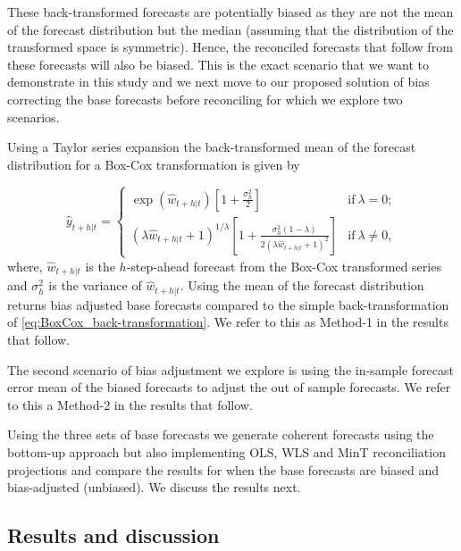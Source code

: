 \documentclass[12pt]{article}
\theoremstyle{definition}
\theoremstyle{property}
\begin{document}
These back-transformed forecasts are potentially biased as they are not the mean of the forecast distribution but the median (assuming that the distribution of the transformed space is symmetric). Hence, the reconciled forecasts that follow from these forecasts will also be biased. This is the exact scenario that we want to demonstrate in this study and we next move to our proposed solution of bias correcting the base forecasts before reconciling for which we explore two scenarios.

Using a Taylor series expansion  the back-transformed mean of the forecast distribution for a Box-Cox transformation is given by

\begin{equation} \label{eq:BoxCox_BT_biasadj}
	 \hat{y}_{t+h|t} =
	\begin{cases}
	\exp({\hat{w}_{t+h|t}})[1+\frac{\sigma_h^2}{2}] & \text{if}~\lambda = 0; \\
	(\lambda \hat{w}_{t+h|t} + 1)^{1/\lambda}[1 + \frac{\sigma_h^2(1-\lambda)}{2(\lambda \hat{w}_{t+h|t} + 1)^2}]       & \text{if}~\lambda \ne 0,
	\end{cases}
	\end{equation}
where, $\hat{w}_{t+h|t}$ is the $h$-step-ahead forecast from the Box-Cox transformed series and $\sigma_h^2$ is the variance of $\hat{w}_{t+h|t}$. Using the mean of the forecast distribution returns bias adjusted base forecasts compared to the simple back-transformation of \eqref{eq:BoxCox_back-transformation}. We refer to this as Method-1 in the results that follow.

The second scenario of bias adjustment we explore is using the in-sample forecast error mean of the biased forecasts to adjust the out of sample forecasts. We refer to this a Method-2 in the results that follow.
	
Using the three sets of base forecasts we generate coherent forecasts using the bottom-up approach but also implementing OLS, WLS and MinT reconciliation projections and compare the results for when the base forecasts are biased and bias-adjusted (unbiased). We discuss the results next.

\subsection{Results and discussion}


\end{document}
